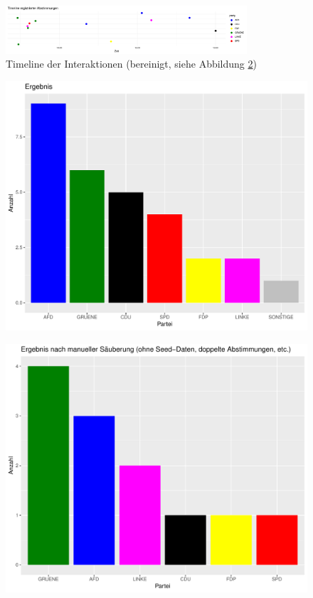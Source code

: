 \begin{figure}[ht]
    \centering
    \includegraphics[width=0.8\textwidth]{figures/timeline-cleaned.pdf}
    \caption{Timeline der Interaktionen (bereinigt, siehe Abbildung \ref{fig:result-cleaned})}
    \label{fig:timeline}
\end{figure}

\begin{figure}[ht]
    \centering
    \begin{minipage}{.48\textwidth}
        \centering
        \includegraphics[width=.9\linewidth]{figures/result-all.pdf}
        \label{fig:result-all}
    \end{minipage}%
    \begin{minipage}{.48\textwidth}
        \centering
        \includegraphics[width=.9\linewidth]{figures/result-cleaned.pdf}
        \label{fig:result-cleaned}
    \end{minipage}
\end{figure}
